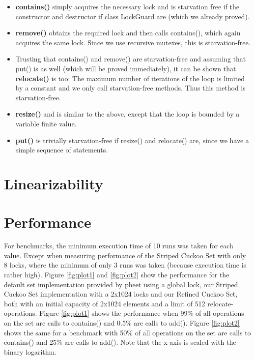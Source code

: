 \documentclass[a4paper,10pt]{article}
\begin{document}
\begin{itemize}
\item \textbf{contains()} simply acquires the necessary lock and is starvation free if the constructor and destructor if class LockGuard are (which we already proved).
\item \textbf{remove()} obtains the required lock and then calls contains(), which again acquires the same lock. Since we use recursive mutexes, this is starvation-free. 
\item Trusting that contains() and remove() are starvation-free and assuming that put() is as well (which will be proved immediately), it can be shown that \textbf{relocate()} is too: The maximum number of iterations of the loop is limited by a constant and we only call starvation-free methods. Thus this method is starvation-free.
\item \textbf{resize()} and is similar to the above, except that the loop is bounded by a variable finite value.
\item \textbf{put()} is trivially starvation-free if resize() and relocate() are, since we have a simple sequence of statements. 
\end{itemize}

\section{Linearizability}
\label{serc:linearizability}

\section{Performance}
\label{sec:performance}
For benchmarks, the minimum execution time of 10 runs was taken for each value. Except when measuring performance of the Striped Cuckoo Set with only 8 locks, where the minimum of only 3 runs was taken (because execution time is rather high).
\medskip
\newline
Figure \ref{fig:plot1} and \ref{fig:plot2} show the performance for the default set implementation provided by pheet using a global lock, our Striped Cuckoo Set implementation with a 2x1024 locks and our Refined Cuckoo Set, both with an initial capacity of 2x1024 elements and a limit of 512 relocate-operations. Figure \ref{fig:plot1} shows the performance when 99\% of all operations on the set are calls to contains() and 0.5\% are calls to add(). Figure \ref{fig:plot2} shows the same for a benchmark with 50\% of all operations on the set are calls to contains() and 25\% are calls to add().
\newline
Note that the x-axis is scaled with the binary logarithm.
\end{document}
